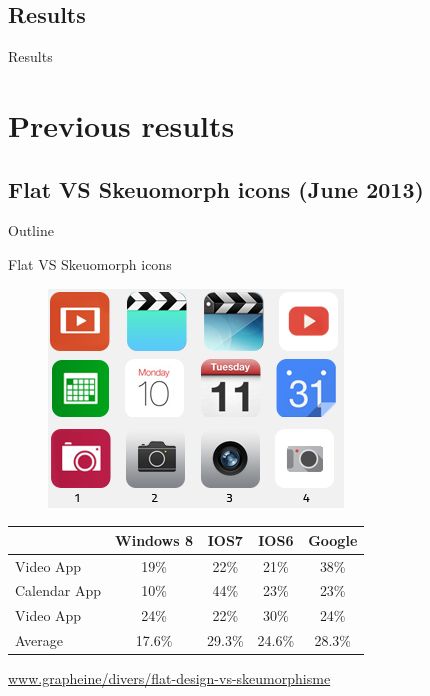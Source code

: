 \documentclass{beamer}
\begin{document}
\subsection{Results}

\begin{frame}{Results}


\end{frame}

\section{Previous results}
\subsection{Flat VS Skeuomorph icons (June 2013)}

\begin{frame}{Outline}
    \tableofcontents[currentsection]
\end{frame}

\begin{frame}{Flat VS Skeuomorph icons}
	\begin{figure}
	\centering
	\includegraphics[scale=0.5]{flat.png}
	\end{figure}
    \begin{center}
      \begin{tabular}{|l|c|c|c|c|}
        \hline
        &Windows 8 & IOS7 & IOS6 & Google\\
        \hline
        Video App 	& 19\%	& 22\%	& 21\%	& 38\% \\
        Calendar App& 10\%	& 44\%	& 23\%	& 23\% \\
        Video App	& 24\%	& 22\%	& 30\%	& 24\% \\
        \hline
        Average		& 17.6\%& 29.3\%& 24.6\%& 28.3\% \\
        \hline
      \end{tabular}
    \end{center}
    	\begin{flushright}\tiny\url{www.grapheine/divers/flat-design-vs-skeumorphisme}\normalsize\end{flushright}
\end{frame}
\end{document}
